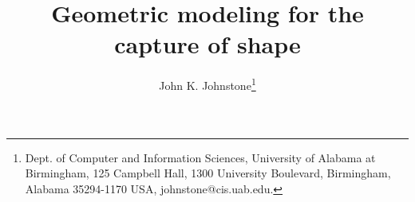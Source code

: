 \newcommand{\SingleSpace}{\edef\baselinestretch{0.9}\Large\normalsize}
\newcommand{\DoubleSpace}{\edef\baselinestretch{1.4}\Large\normalsize}
\newcommand{\Comment}[1]{\relax}  %
\newcommand{\Heading}[1]{\par\noindent{\bf#1}\nobreak}
\newcommand{\Tail}[1]{\nobreak\par\noindent{\bf#1}}
\newcommand{\QED}{\vrule height 1.4ex width 1.0ex depth -.1ex\ } %
\newcommand{\arc}[1]{\mbox{$\stackrel{\frown}{#1}$}}
\newcommand{\lyne}[1]{\mbox{$\stackrel{\leftrightarrow}{#1}$}}
\newcommand{\ray}[1]{\mbox{$\vec{#1}$}}          
\newcommand{\seg}[1]{\mbox{$\overline{#1}$}}
\newcommand{\tab}{\hspace*{.2in}}
\newcommand{\se}{\mbox{$_{\epsilon}$}}  %
\newcommand{\ie}{\mbox{i.e.}}
\newcommand{\eg}{\mbox{e.\ g.\ }}
\newcommand{\figg}[3]{\begin{figure}[htbp]\vspace{#3}\caption{#2}\label{#1}\end{figure}}
\newcommand{\be}{\begin{equation}}
\newcommand{\ee}{\end{equation}}
\newcommand{\prf}{\noindent{{\bf Proof} :\ }}
\newcommand{\choice}[2]{\left( \begin{array}{c} \mbox{\footnotesize{$#1$}} \\ \mbox{\footnotesize{$#2$}} \end{array} \right)}      
\newcommand{\ddt}{\frac{\partial}{\partial t}}

\newtheorem{rmk}{Remark}[section]
\newtheorem{example}{Example}[section]
\newtheorem{conjecture}{Conjecture}[section]
\newtheorem{claim}{Claim}[section]
\newtheorem{notation}{Notation}[section]
\newtheorem{lemma}{Lemma}[section]
\newtheorem{theorem}{Theorem}[section]
\newtheorem{corollary}{Corollary}[section]
\newtheorem{defn2}{Definition}

\SingleSpace

\setlength{\oddsidemargin}{0pt}
\setlength{\evensidemargin}{0pt}
\setlength{\headsep}{0pt}
\setlength{\topmargin}{0pt}
\setlength{\textheight}{8.75in}
\setlength{\textwidth}{6.5in}
\setlength{\headsep}{.2in}




\title{Geometric modeling for the capture of shape}
\author{John K. Johnstone\thanks{Dept. of Computer and Information 
        Sciences,
        University of Alabama at Birmingham,
        125 Campbell Hall, 1300 University Boulevard,
        Birmingham, Alabama  35294-1170 USA, johnstone@cis.uab.edu.}}


